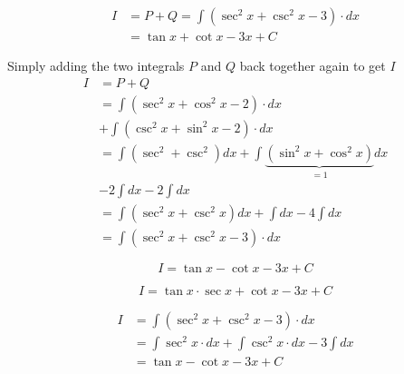 \documentclass[14pt,fleqn]{extarticle}
\begin{document}
\begin{question}
\begin{step}
  \begin{options} 
     \correct 
     
     \begin{align}
	I &= P + Q = \int \left(\sec^2 x + \csc^2 x - 3 \right)\cdot dx \\
	&= \tan x + \cot x -3x + C 
\end{align}
       
    \end{options} 
     \reason 
     
     Simply adding the two integrals $P$ and $Q$ back together again to get $I$
     \begin{align}
	I &= P + Q \\ 
	&= \int \left(\sec^2 x + \cos^2 x - 2 \right)\cdot dx \\
	&+ \int \left(\csc^2 x + \sin^2 x - 2 \right)\cdot dx \\ 
	&= \int \left(\sec^2 + \csc^2 \right) dx + \int \underbrace{\left(\sin^2x + \cos^2 x\right)}_{=1} dx \\
	&- 2\int dx - 2\int dx \\
	&= \int \left(\sec^2 x + \csc^2 x \right)dx + \int dx - 4 \int dx \\
	&= \int \left(\sec^2 x + \csc^2 x - 3\right)\cdot dx 
\end{align}
       
\end{step}

\begin{step}
  \begin{options} 
     \correct 
       
       \[ I = \tan x - \cot x - 3x + C \]
     \incorrect
        
         \[ I = \tan x\cdot \sec x +\cot x - 3x + C \]
    \end{options} 
     \reason 
       
       \begin{align}
	I &= \int \left(\sec^2x + \csc^2 x - 3 \right)\cdot dx \\ 
	&= \int \sec^2 x\cdot dx + \int \csc^2 x \cdot dx - 3 \int dx \\
	&= \tan x - \cot x - 3x + C 
\end{align}
\end{step}
\end{question} 
\end{document}
